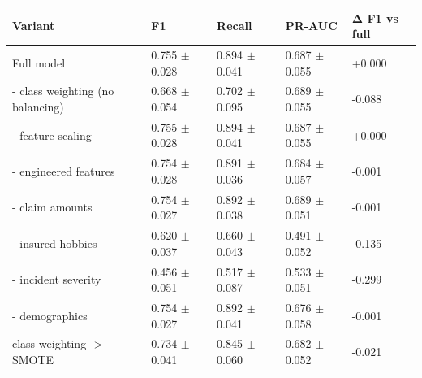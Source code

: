 \begin{tabular}{lllll}
\toprule
Variant & F1 & Recall & PR-AUC & Δ F1 vs full \\
\midrule
Full model & 0.755 $\pm$ 0.028 & 0.894 $\pm$ 0.041 & 0.687 $\pm$ 0.055 & +0.000 \\
- class weighting (no balancing) & 0.668 $\pm$ 0.054 & 0.702 $\pm$ 0.095 & 0.689 $\pm$ 0.055 & -0.088 \\
- feature scaling & 0.755 $\pm$ 0.028 & 0.894 $\pm$ 0.041 & 0.687 $\pm$ 0.055 & +0.000 \\
- engineered features & 0.754 $\pm$ 0.028 & 0.891 $\pm$ 0.036 & 0.684 $\pm$ 0.057 & -0.001 \\
- claim amounts & 0.754 $\pm$ 0.027 & 0.892 $\pm$ 0.038 & 0.689 $\pm$ 0.051 & -0.001 \\
- insured hobbies & 0.620 $\pm$ 0.037 & 0.660 $\pm$ 0.043 & 0.491 $\pm$ 0.052 & -0.135 \\
- incident severity & 0.456 $\pm$ 0.051 & 0.517 $\pm$ 0.087 & 0.533 $\pm$ 0.051 & -0.299 \\
- demographics & 0.754 $\pm$ 0.027 & 0.892 $\pm$ 0.041 & 0.676 $\pm$ 0.058 & -0.001 \\
class weighting -> SMOTE & 0.734 $\pm$ 0.041 & 0.845 $\pm$ 0.060 & 0.682 $\pm$ 0.052 & -0.021 \\
\bottomrule
\end{tabular}
